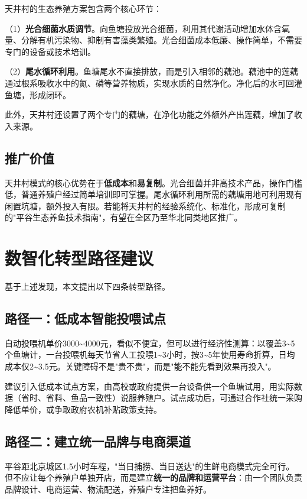 \documentclass[12pt,a4paper]{article}
\begin{document}
天井村的生态养殖方案包含两个核心环节：

（1）\textbf{光合细菌水质调节}。向鱼塘投放光合细菌，利用其代谢活动增加水体含氧量、分解有机污染物、抑制有害藻类繁殖。光合细菌成本低廉、操作简单，不需要专门的设备或技术培训。

（2）\textbf{尾水循环利用}。鱼塘尾水不直接排放，而是引入相邻的藕池。藕池中的莲藕通过根系吸收水中的氮、磷等营养物质，实现水质的自然净化。净化后的水可回灌鱼塘，形成闭环。

此外，天井村还设置了两个专门的藕塘，在净化功能之外额外产出莲藕，增加了收入来源。

\subsection{推广价值}

天井村模式的核心优势在于\textbf{低成本}和\textbf{易复制}。光合细菌并非高技术产品，操作门槛低，普通养殖户经过简单培训即可掌握。尾水循环利用所需的藕塘用地可利用现有闲置坑塘，额外投入有限。若能将天井村的经验系统化、标准化，形成可复制的"平谷生态养鱼技术指南"，有望在全区乃至华北同类地区推广。

\section{数智化转型路径建议}

基于上述发现，本文提出以下四条转型路径。

\subsection{路径一：低成本智能投喂试点}

自动投喂机单价3000\textasciitilde4000元，看似不便宜，但可以进行经济性测算：以覆盖3\textasciitilde5个鱼塘计，一台投喂机每天节省人工投喂1\textasciitilde3小时，按3\textasciitilde5年使用寿命折算，日均成本仅2\textasciitilde3.5元。关键障碍不是"贵不贵"，而是"能不能先看到效果再投入"。

建议引入低成本试点方案，由高校或政府提供一台设备供一个鱼塘试用，用实际数据（省时、省料、鱼品一致性）说服养殖户。试点成功后，可通过合作社统一采购降低单价，或争取政府农机补贴政策支持。

\subsection{路径二：建立统一品牌与电商渠道}

平谷距北京城区1.5小时车程，"当日捕捞、当日送达"的生鲜电商模式完全可行。但不应让每个养殖户单独开店，而是建立\textbf{统一的品牌和运营平台}：由一个团队负责品牌设计、电商运营、物流配送，养殖户专注把鱼养好。
\end{document}
